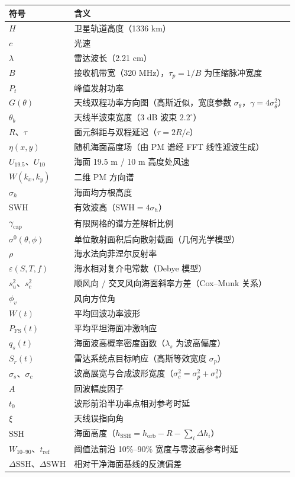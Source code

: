 \documentclass[a4paper]{article}
\newcommand{\song}{\CJKfamily{song}}
\newcommand{\wuhao}{\fontsize{10.5pt}{18pt}\selectfont}
\begin{document}
{\song\wuhao
\begin{longtable}{p{3.4cm}p{10.4cm}}
	\toprule
	符号 & 含义 \\
	\hline
	\endhead
		$H$ & 卫星轨道高度（1336 km） \\
		$c$ & 光速 \\
		$\lambda$ & 雷达波长（2.21 cm） \\
		$B$ & 接收机带宽（320 MHz），$\tau_p = 1/B$ 为压缩脉冲宽度 \\
		$P_t$ & 峰值发射功率 \\
		$G(\theta)$ & 天线双程功率方向图（高斯近似，宽度参数 $\sigma_\theta$，$\gamma = 4\sigma_\theta^{2}$） \\
		$\theta_b$ & 天线半波束宽度（3 dB 波束 $2.2^\circ$） \\
		$R$、$\tau$ & 面元斜距与双程延迟（$\tau = 2R/c$） \\
		$\eta(x,y)$ & 随机海面高度场（由 PM 谱经 FFT 线性滤波生成） \\
		$U_{19.5}$、$U_{10}$ & 海面 19.5 m / 10 m 高度处风速 \\
		$W(k_x,k_y)$ & 二维 PM 方向谱 \\
		$\sigma_h$ & 海面均方根高度 \\
		$\mathrm{SWH}$ & 有效波高（$\mathrm{SWH} = 4\sigma_h$） \\
		$\gamma_{\mathrm{cap}}$ & 有限网格的谱方差解析比例 \\
		$\sigma^0(\theta,\phi)$ & 单位散射面积后向散射截面（几何光学模型） \\
		$\rho$ & 海水法向菲涅尔反射率 \\
		$\varepsilon(S,T,f)$ & 海水相对复介电常数（Debye 模型） \\
		$s_u^{2}$、$s_c^{2}$ & 顺风向 / 交叉风向海面斜率方差（Cox--Munk 关系） \\
		$\phi_v$ & 风向方位角 \\
		$W(t)$ & 平均回波功率波形 \\
		$P_{\mathrm{FS}}(t)$ & 平均平坦海面冲激响应 \\
		$q_s(t)$ & 海面波高概率密度函数（$\lambda_s$ 为波高偏度） \\
		$S_r(t)$ & 雷达系统点目标响应（高斯等效宽度 $\sigma_p$） \\
		$\sigma_s$、$\sigma_c$ & 波高展宽与合成波形宽度（$\sigma_c^{2} = \sigma_p^{2} + \sigma_s^{2}$） \\
		$A$ & 回波幅度因子 \\
		$t_0$ & 波形前沿半功率点相对参考时延 \\
		$\xi$ & 天线误指向角 \\
		$\mathrm{SSH}$ & 海面高度（$h_{\mathrm{SSH}} = h_{\mathrm{orb}} - R - \sum_i \Delta h_i$） \\
		$W_{10\text{--}90}$、$t_{\mathrm{ref}}$ & 阈值法前沿 10\%--90\% 宽度与零波高参考时延 \\
	$\Delta\mathrm{SSH}$、$\Delta\mathrm{SWH}$ & 相对干净海面基线的反演偏差 \\
	\bottomrule
\end{longtable}}
\end{document}
